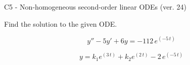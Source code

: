 \begin{exercise}
  \begin{exerciseTitle}C5 - Non-homogeneous second-order linear ODEs (ver. 24)\end{exerciseTitle}
  \begin{exerciseStatement}
    
Find the solution to the given ODE.

    
\[y''-5y'+6y = -112 \, e^{\left(-5 \, t\right)}\]

  \end{exerciseStatement}
  \begin{exerciseAnswer}
    
\[y= k_{1} e^{\left(3 \, t\right)} + k_{2} e^{\left(2 \, t\right)} - 2 \, e^{\left(-5 \, t\right)}\]

  \end{exerciseAnswer}
\end{exercise}